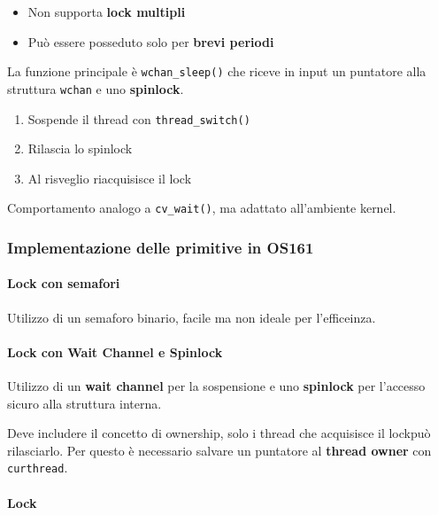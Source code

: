 \begin{itemize}
  \item Non supporta \textbf{lock multipli}
  \item Può essere posseduto solo per \textbf{brevi periodi}
\end{itemize}

La funzione principale è \verb|wchan_sleep()| che riceve in input un puntatore alla
struttura \verb|wchan| e uno \textbf{spinlock}.

\begin{enumerate}
  \item Sospende il thread con \verb|thread_switch()|
  \item Rilascia lo spinlock
  \item Al risveglio riacquisisce il lock
\end{enumerate}

Comportamento analogo a \verb|cv_wait()|, ma adattato all'ambiente kernel.

\subsubsection{Implementazione delle primitive in OS161}

\paragraph{Lock con semafori}

Utilizzo di un semaforo binario, facile ma non ideale per l'efficeinza.

\paragraph{Lock con Wait Channel e Spinlock}

Utilizzo di un \textbf{wait channel} per la sospensione e uno \textbf{spinlock} per
l'accesso sicuro alla struttura interna.

Deve includere il concetto di ownership, solo i thread che acquisisce il lockpuò rilasciarlo.
Per questo è necessario salvare un puntatore al \textbf{thread owner} con \verb|curthread|.


\paragraph{Lock}

